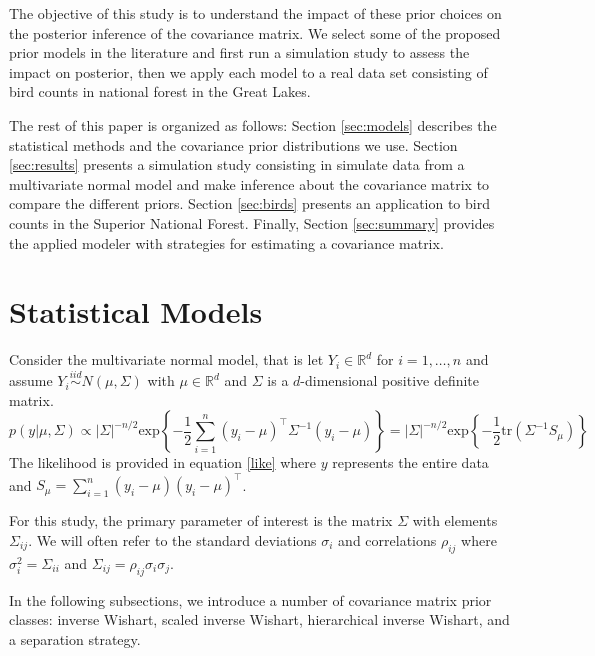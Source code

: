 \documentclass[12pt]{article}
\begin{document}
The objective of this study is to understand the impact of these prior choices on the posterior inference of the covariance matrix. We select some of the proposed prior models in the literature and first run a simulation study to assess the impact on posterior, then we apply each model to a real data set consisting of bird counts in national forest in the Great Lakes. 

The rest of this paper is organized as follows: Section \ref{sec:models} describes the statistical methods and the covariance prior distributions we use. Section \ref{sec:results} presents a simulation study consisting in simulate data from a multivariate normal model and make inference about the covariance matrix to compare the different priors. Section \ref{sec:birds} presents an application to bird counts in the Superior National Forest. Finally, Section \ref{sec:summary} provides the applied modeler with strategies for estimating a covariance matrix. 

\section{Statistical Models \label{sec:models} }

Consider the multivariate normal model, that is let $Y_i\in \mathbb{R}^d$ for $i=1,\ldots,n$ and assume $Y_i \stackrel{iid}{\sim} N(\mu, \Sigma)$ with $\mu\in \mathbb{R}^d$ and $\Sigma$ is a $d$-dimensional positive definite matrix.   
  \begin{equation}
 p(y\vert \mu,\Sigma) \propto |\Sigma|^{-n/2} \mbox{exp}\left\{- \frac{1}{2} \sum_{i=1}^n (y_i-\mu)^\top \Sigma^{-1} (y_i-\mu) \right\} = |\Sigma|^{-n/2}  \mbox{exp}\left\{- \frac{1}{2}  \mbox{tr}(\Sigma^{-1}S_\mu)  \right\} 
 \label{like}
 \end{equation}
The likelihood is provided in equation \eqref{like} where $y$ represents the entire data and  $S_\mu = \sum_{i=1}^n (y_i-\mu) (y_i-\mu) ^\top$. 

For this study, the primary parameter of interest is the matrix $\Sigma$ with elements $\Sigma_{ij}$. We will often refer to the standard deviations $\sigma_i$ and correlations $\rho_{ij}$ where $\sigma_i^2 = \Sigma_{ii}$ and $\Sigma_{ij} = \rho_{ij}\sigma_i\sigma_j$. 

In the following subsections, we introduce a number of covariance matrix prior classes: inverse Wishart, scaled inverse Wishart, hierarchical inverse Wishart, and a separation strategy. %
\end{document}
